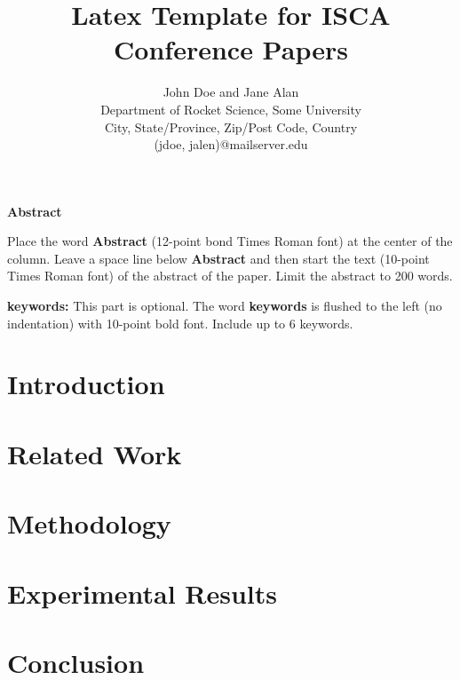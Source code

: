\documentclass[letterpaper,twocolumn]{article}
\date{}
\begin{document}
\title{\Large\textbf{Latex Template for ISCA Conference Papers}\normalsize}

\author {John Doe and Jane Alan\\
Department of Rocket Science, Some University\\
City, State/Province, Zip/Post Code, Country\\
(jdoe, jalen)@mailserver.edu
}
\maketitle 

\thispagestyle{empty}

\begin{center}
\large\textbf{Abstract}
\end{center}

\vspace{2mm}
Place the word \textbf{Abstract} (12-point bond Times Roman font) at the center of the column. Leave a space line below \textbf{Abstract} and then start the text (10-point Times Roman font) of the abstract of the paper. Limit the abstract to 200 words.

\medskip
\noindent
\textbf{keywords:} This part is optional. The word \textbf{keywords} is flushed to the left (no indentation) with 10-point bold font. Include up to 6 keywords. %

\section{Introduction} 


\section{Related Work}

\section{Methodology}

\section{Experimental Results}

\section{Conclusion}
\end{document}
